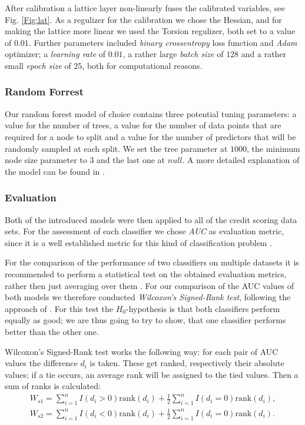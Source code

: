 After calibration a lattice layer non-linearly fuses the calibrated variables, see Fig. \ref{Fig:lat}. As a regulizer for the calibration we chose the Hessian, and for making the lattice more linear we used the Torsion regulizer, both set to a value of $0.01$. Further parameters included\textit{ binary crossentropy} loss function and \textit{Adam} optimizer; a \textit{learning rate} of $0.01$, a rather large \textit{batch size} of $128$ and a rather small \textit{epoch size} of $25$, both for computational reasons.

\subsubsection*{Random Forrest}

Our random forest model of choice contains three potential tuning parameters:  a value for the number of trees, a value for the number of data points that are required for a node to split and a value for the number of predictors that will be randomly sampled at each split. We set the tree parameter at $1000$, the minimum node size parameter to $3$ and the last one at $null$. A more detailed explanation of the model can be found in \citep{breiman2001random}.

\subsubsection*{Evaluation}

Both of the introduced models were then applied to all of the credit scoring data sets. For the assessment of each classifier we chose \textit{AUC} as evaluation metric, since it is a well established metric for this kind of classification problem \citep{lessmann2015benchmarking}.

For the comparison of the performance of two classifiers on multiple datasets it is recommended to perform a statistical test on the obtained evaluation metrics, rather then just averaging over them \citep{japkowicz2011evaluating}. For our comparison of the AUC values of both models we therefore conducted \textit{Wilcoxon's Signed-Rank test}, following the approach of \citep[Sec.~6.6]{japkowicz2011evaluating}. For this test the $H_0$-hypothesis is that both classifiers perform equally as good; we are thus going to try to show, that one classifier performs better than the other one. 
\medskip

Wilcoxon's Signed-Rank test works the following way: for each pair of AUC values the difference $d_i$ is taken. These get ranked, respectively their absolute values; if a tie occurs, an average rank will be assigned to the tied values. Then a sum of ranks is calculated:
\begin{align*}
W_{s1} = \sum_{i=1}^{n} I(d_i > 0) \mathrm{rank}(d_i) + \frac{1}{2} \sum_{i=1}^{n} I(d_i = 0)\mathrm{rank}(d_i),  \\	
W_{s2} = \sum_{i=1}^{n} I(d_i < 0) \mathrm{rank}(d_i) + \frac{1}{2} \sum_{i=1}^{n} I(d_i = 0)\mathrm{rank}(d_i). 
\end{align*}

